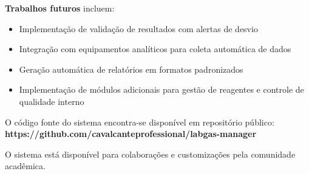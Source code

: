 \documentclass[12pt,a4paper]{article}
\providecommand\关键字[1]{\textbf{#1}}
\begin{document}
\textbf{Trabalhos futuros} incluem:

\begin{itemize}
\item Implementação de validação de resultados com alertas de desvio
\item Integração com equipamentos analíticos para coleta automática de dados
\item Geração automática de relatórios em formatos padronizados
\item Implementação de módulos adicionais para gestão de reagentes e controle de qualidade interno
\end{itemize}

O código fonte do sistema encontra-se disponível em repositório público: \textbf{https://github.com/cavalcanteprofessional/labgas-manager}

O sistema está disponível para colaborações e customizações pela comunidade acadêmica.
\end{document}
